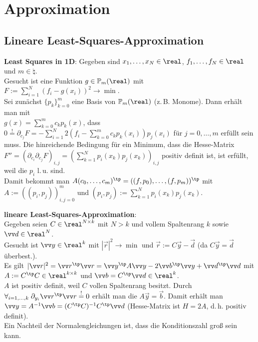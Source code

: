 \chapter{%
    Approximation%
}

\section{%
    Lineare Least-Squares-Approximation%
}

\textbf{Least Squares in 1D}:
Gegeben sind $x_1, \dotsc, x_N \in \real$, $f_1, \dotsc, f_N \in \real$ und $m \in \natural$.\\
Gesucht ist eine Funktion $g \in \PP_m(\real)$ mit
$F := \sum_{i=1}^N (f_i - g(x_i))^2 \to \min$.\\
Sei zunächst $\{p_k\}_{k=0}^m$ eine Basis von $\PP_m(\real)$ (z.\,B. Monome).
Dann erhält man mit\\
$g(x) = \sum_{k=0}^m c_k p_k(x)$, dass
$0 \overset{!}{=} \partial_{c_j} F = -\sum_{i=1}^N 2(f_i - \sum_{k=0}^m c_k p_k(x_i)) p_j(x_i)$
für $j = 0, \dotsc, m$
erfüllt sein muss.
Die hinreichende Bedingung für ein Minimum, dass die Hesse-Matrix\\
$F'' = (\partial_{c_i} \partial_{c_j} F)_{i,j}
= (\sum_{k=1}^N p_i(x_k) p_j(x_k))_{i,j}$ positiv definit ist,
ist erfüllt, weil die $p_i$ l.\,u. sind.\\
Damit bekommt man
$A (c_0, \dotsc, c_m)^\tp = ((f, p_0), \dotsc, (f, p_m))^\tp$
mit $A := ((p_i, p_j))_{i,j=0}^m$ und $(p_i, p_j) := \sum_{k=1}^N p_i(x_k) p_j(x_k)$.

\linie

\textbf{lineare Least-Squares-Approximation}:\\
Gegeben seien $C \in \real^{N \times k}$ mit $N > k$ und vollem Spaltenrang $k$ sowie
$\vec{d} \in \real^N$.\\
Gesucht ist $\vec{y} \in \real^k$ mit $|\vec{r}|^2 \to \min$ und
 $\vec{r} := C\vec{y} - \vec{d}$
(da $C\vec{y} = \vec{d}$ überbest.).\\
Es gilt
$|\vec{r}|^2
= \vec{r}^\tp \vec{r}
= \vec{y}^\tp A \vec{y} - 2\vec{b}^\tp \vec{y} + \vec{d}^\tp \vec{d}$
mit $A := C^\tp C \in \real^{k \times k}$ und $\vec{b} = C^\tp \vec{d} \in \real^k$.\\
$A$ ist positiv definit, weil $C$ vollen Spaltenrang besitzt.
Durch $\forall_{i=1,\dotsc,k}\; \partial_{y_i} \vec{r}^\tp \vec{r} \overset{!}{=} 0$
erhält man die  $A\vec{y} = \vec{b}$.
Damit erhält man $\vec{y} = A^{-1} \vec{b} = (C^\tp C)^{-1} C^\tp \vec{d}$
(Hesse-Matrix ist $H = 2A$, d.\,h. positiv definit).\\
Ein Nachteil der Normalengleichungen ist, dass die Konditionszahl groß sein kann.

